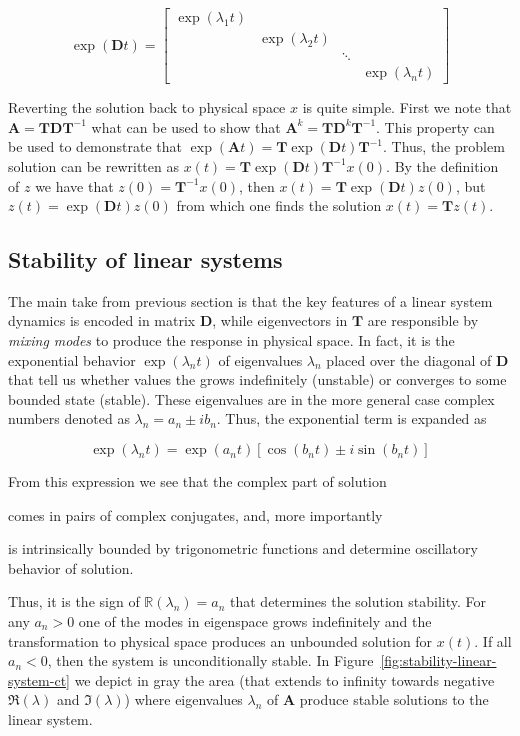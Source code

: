 \begin{equation}
\exp(\mathbf{D}t)=
\begin{bmatrix}
	\exp(\lambda_{1}t) & & & \\
	& \exp(\lambda_{2}t) & & \\
	& & \ddots & \\
	& & & \exp(\lambda_{n}t)
\end{bmatrix}
\end{equation}

Reverting the solution back to physical space $x$ is quite simple. First we note that $\mathbf{A}=\mathbf{T}\mathbf{D}\mathbf{T}^{-1}$ what can be used to show that $\mathbf{A}^{k}=\mathbf{T}\mathbf{D}^{k}\mathbf{T}^{-1}$. This property can be used to demonstrate that $\exp(\mathbf{A}t)=\mathbf{T}\exp(\mathbf{D}t)\mathbf{T}^{-1}$. Thus, the problem solution can be rewritten as $x(t)=\mathbf{T}\exp(\mathbf{D}t)\mathbf{T}^{-1}x(0)$. By the definition of $z$ we have that $z(0)=\mathbf{T}^{-1}x(0)$, then $x(t)=\mathbf{T}\exp(\mathbf{D}t)z(0)$, but $z(t)=\exp(\mathbf{D}t)z(0)$ from which one finds the solution $x(t)=\mathbf{T}z(t)$.

\subsection{Stability of linear systems}

The main take from previous section is that the key features of a linear system dynamics is encoded in matrix $\mathbf{D}$, while eigenvectors in $\mathbf{T}$ are responsible by \emph{mixing modes} to produce the response in physical space. In fact, it is the exponential behavior $\exp(\lambda_{n}t)$ of eigenvalues $\lambda_{n}$ placed over the diagonal of $\mathbf{D}$ that tell us whether values the grows indefinitely (unstable) or converges to some bounded state (stable). These eigenvalues are in the more general case complex numbers denoted as $\lambda_{n}=a_{n}\pm{}ib_{n}$. Thus, the exponential term is expanded as

\begin{equation}
\exp(\lambda_{n}t)=\exp(a_{n}t)\left[\cos\left(b_{n}t\right)\pm{}i\sin\left(b_{n}t\right)\right]
\end{equation}

From this expression we see that the complex part of solution \begin{inparaenum}[(i)]\item comes in pairs of complex conjugates, and, more importantly \item is intrinsically bounded by trigonometric functions and determine oscillatory behavior of solution. \end{inparaenum} Thus, it is the sign of $\mathbb{R}(\lambda_{n})=a_{n}$ that determines the solution stability. For any $a_{n}>0$ one of the modes in eigenspace grows indefinitely and the transformation to physical space produces an unbounded solution for $x(t)$. If all $a_{n}<0$, then the system is unconditionally stable. In Figure~\ref{fig:stability-linear-system-ct} we depict in gray the area (that extends to infinity towards negative $\Re(\lambda)$ and $\Im(\lambda)$) where eigenvalues $\lambda_{n}$ of $\mathbf{A}$ produce stable solutions to the linear system.

